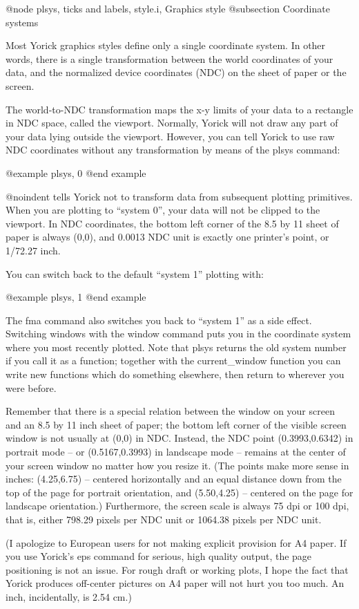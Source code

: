 @node plsys, ticks and labels, style.i, Graphics style
@subsection Coordinate systems

Most Yorick graphics styles define only a single coordinate system.
In other words, there is a single transformation between the world
coordinates of your data, and the normalized device coordinates (NDC)
on the sheet of paper or the screen.

The world-to-NDC transformation maps the x-y limits of your data to a
rectangle in NDC space, called the viewport.  Normally, Yorick will
not draw any part of your data lying outside the viewport.  However,
you can tell Yorick to use raw NDC coordinates without any
transformation by means of the plsys command:

@example
plsys, 0
@end example

@noindent
tells Yorick not to transform data from subsequent plotting
primitives.  When you are plotting to ``system 0'', your data will not
be clipped to the viewport.  In NDC coordinates, the bottom left
corner of the 8.5 by 11 sheet of paper is always (0,0), and 0.0013 NDC
unit is exactly one printer's point, or 1/72.27 inch.

You can switch back to the default ``system 1'' plotting with:

@example
plsys, 1
@end example

The fma command also switches you back to ``system 1'' as a side effect.
Switching windows with the window command puts you in the coordinate
system where you most recently plotted.  Note that plsys returns the old
system number if you call it as a function; together with the
current_window function you can write new functions which do something
elsewhere, then return to wherever you were before.

Remember that there is a special relation between the window on your
screen and an 8.5 by 11 inch sheet of paper; the bottom left corner of
the visible screen window is not usually at (0,0) in NDC.  Instead,
the NDC point (0.3993,0.6342) in portrait mode -- or (0.5167,0.3993)
in landscape mode -- remains at the center of your screen window no
matter how you resize it.  (The points make more sense in inches:
(4.25,6.75) -- centered horizontally and an equal distance down from
the top of the page for portrait orientation, and (5.50,4.25) --
centered on the page for landscape orientation.)  Furthermore, the
screen scale is always 75 dpi or 100 dpi, that is, either 798.29
pixels per NDC unit or 1064.38 pixels per NDC unit.

(I apologize to European users for not making explicit provision for
A4 paper.  If you use Yorick's eps command for serious, high quality
output, the page positioning is not an issue.  For rough draft or
working plots, I hope the fact that Yorick produces off-center
pictures on A4 paper will not hurt you too much.  An inch,
incidentally, is 2.54 cm.)

